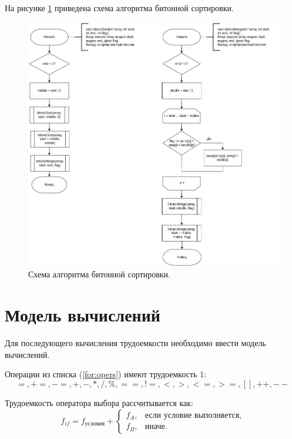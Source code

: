 \newpage
На рисунке \ref{img:bitonic} приведена схема алгоритма битонной сортировки.
\begin{figure}[h]
	\centering
	\includegraphics[width=175mm]{images/bitonic}
	\caption{Схема алгоритма битонной сортировки.}
	\label{img:bitonic}
\end{figure}

\section{Модель вычислений}

Для последующего вычисления трудоемкости необходимо ввести модель вычислений.

Операции из списка (\ref{for:opers}) имеют трудоемкость 1:
\begin{equation}
	\label{for:opers}
	=, +=, -=, +, -, *, /, \%, ==, !=, <, >, <=, >=, [], ++, {-}-
\end{equation}

Трудоемкость оператора выбора  рассчитывается как:
\begin{equation}
	\label{for:if}
	f_{if} = f_{\text{условия}} +
	\begin{cases}
		f_A, & \text{если условие выполняется,}\\
		f_B, & \text{иначе.}
	\end{cases}
\end{equation}

